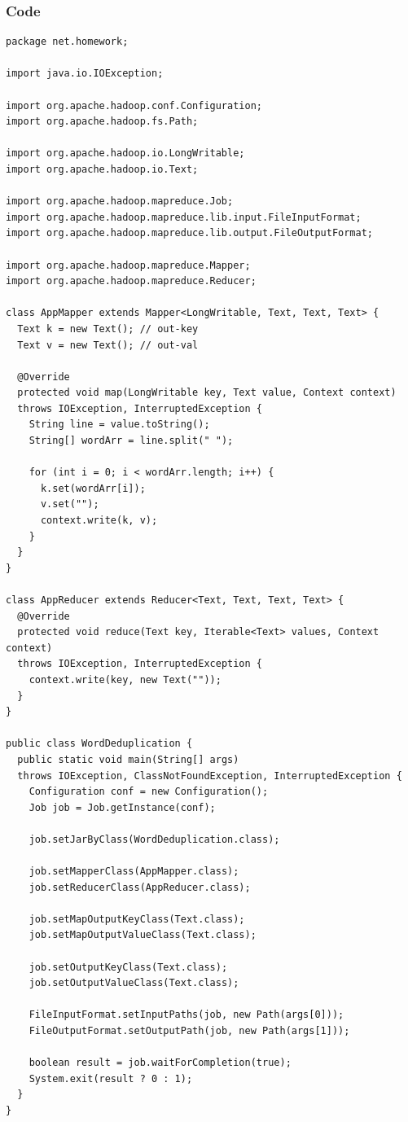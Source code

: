 \documentclass{article}
\begin{document}
    \subsubsection{Code}
    \begin{center}
\begin{verbatim}
package net.homework;

import java.io.IOException;

import org.apache.hadoop.conf.Configuration;
import org.apache.hadoop.fs.Path;

import org.apache.hadoop.io.LongWritable;
import org.apache.hadoop.io.Text;

import org.apache.hadoop.mapreduce.Job;
import org.apache.hadoop.mapreduce.lib.input.FileInputFormat;
import org.apache.hadoop.mapreduce.lib.output.FileOutputFormat;

import org.apache.hadoop.mapreduce.Mapper;
import org.apache.hadoop.mapreduce.Reducer;

class AppMapper extends Mapper<LongWritable, Text, Text, Text> {
  Text k = new Text(); // out-key
  Text v = new Text(); // out-val

  @Override
  protected void map(LongWritable key, Text value, Context context)
  throws IOException, InterruptedException {
    String line = value.toString();
    String[] wordArr = line.split(" ");

    for (int i = 0; i < wordArr.length; i++) {
      k.set(wordArr[i]);
      v.set("");
      context.write(k, v);
    }
  }
}

class AppReducer extends Reducer<Text, Text, Text, Text> {
  @Override
  protected void reduce(Text key, Iterable<Text> values, Context context)
  throws IOException, InterruptedException {
    context.write(key, new Text(""));
  }
}

public class WordDeduplication {
  public static void main(String[] args)
  throws IOException, ClassNotFoundException, InterruptedException {
    Configuration conf = new Configuration();
    Job job = Job.getInstance(conf);

    job.setJarByClass(WordDeduplication.class);

    job.setMapperClass(AppMapper.class);
    job.setReducerClass(AppReducer.class);

    job.setMapOutputKeyClass(Text.class);
    job.setMapOutputValueClass(Text.class);

    job.setOutputKeyClass(Text.class);
    job.setOutputValueClass(Text.class);

    FileInputFormat.setInputPaths(job, new Path(args[0]));
    FileOutputFormat.setOutputPath(job, new Path(args[1]));

    boolean result = job.waitForCompletion(true);
    System.exit(result ? 0 : 1);
  }
}
\end{verbatim}
    \end{center}
\end{document}
